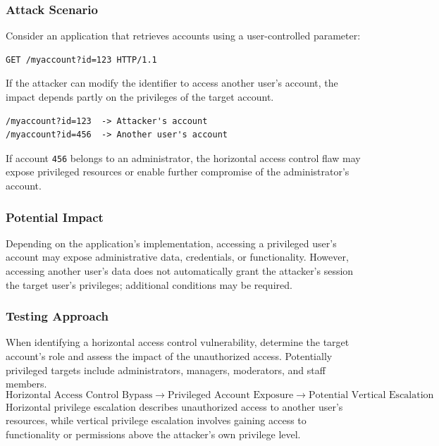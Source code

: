 \documentclass[11pt,a4paper]{article}
\begin{document}
\subsubsection{Attack Scenario}

Consider an application that retrieves accounts using a user-controlled parameter:
\begin{lstlisting}[language=HTTP]
GET /myaccount?id=123 HTTP/1.1
\end{lstlisting}

If the attacker can modify the identifier to access another user's account, the impact depends partly on the privileges of the target account.

\begin{lstlisting}
/myaccount?id=123  -> Attacker's account
/myaccount?id=456  -> Another user's account
\end{lstlisting}

If account \texttt{456} belongs to an administrator, the horizontal access control flaw may expose privileged resources or enable further compromise of the administrator's account.

\subsubsection{Potential Impact}

Depending on the application's implementation, accessing a privileged user's account may expose administrative data, credentials, or functionality. However, accessing another user's data does not automatically grant the attacker's session the target user's privileges; additional conditions may be required.

\subsubsection{Testing Approach}

When identifying a horizontal access control vulnerability, determine the target account's role and assess the impact of the unauthorized access.
Potentially privileged targets include administrators, managers, moderators, and staff members.
\[
    \text{Horizontal Access Control Bypass}
    \rightarrow
    \text{Privileged Account Exposure}
    \rightarrow
    \text{Potential Vertical Escalation}
\]
Horizontal privilege escalation describes unauthorized access to another user's resources, while vertical privilege escalation involves gaining access to functionality or permissions above the attacker's own privilege level.
\end{document}

